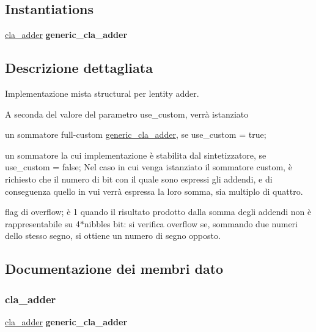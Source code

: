 \subsection*{Instantiations}
 \begin{DoxyCompactItemize}
\item 
\hyperlink{classadder_1_1structural_a94015e32a32cd4c5be09b1ddde822259}{cla\+\_\+adder}  {\bfseries generic\+\_\+cla\+\_\+adder}   
\end{DoxyCompactItemize}


\subsection{Descrizione dettagliata}
Implementazione mista structural per l\textquotesingle{}entity adder.

A seconda del valore del parametro use\+\_\+custom, verrà istanziato
\begin{DoxyItemize}
\item un sommatore full-\/custom \hyperlink{classgeneric__cla__adder}{generic\+\_\+cla\+\_\+adder}, se use\+\_\+custom = true;
\item un sommatore la cui implementazione è stabilita dal sintetizzatore, se use\+\_\+custom = false; Nel caso in cui venga istanziato il sommatore custom, è richiesto che il numero di bit con il quale sono espressi gli addendi, e di conseguenza quello in vui verrà espressa la loro somma, sia multiplo di quattro. 
\end{DoxyItemize}

flag di overflow; è \textquotesingle{}1\textquotesingle{} quando il risultato prodotto dalla somma degli addendi non è rappresentabile su 4$\ast$nibbles bit\+: si verifica overflow se, sommando due numeri dello stesso segno, si ottiene un numero di segno opposto. 

\subsection{Documentazione dei membri dato}
\mbox{\label{classadder_1_1structural_a94015e32a32cd4c5be09b1ddde822259}} 
\subsubsection{\texorpdfstring{cla\+\_\+adder}{cla\_adder}}
{\footnotesize\ttfamily \hyperlink{classadder_1_1structural_a94015e32a32cd4c5be09b1ddde822259}{cla\+\_\+adder} {\bfseries \textcolor{vhdlchar}{generic\+\_\+cla\+\_\+adder}\textcolor{vhdlchar}{ }} \hspace{0.3cm}{\ttfamily [Instantiation]}}

